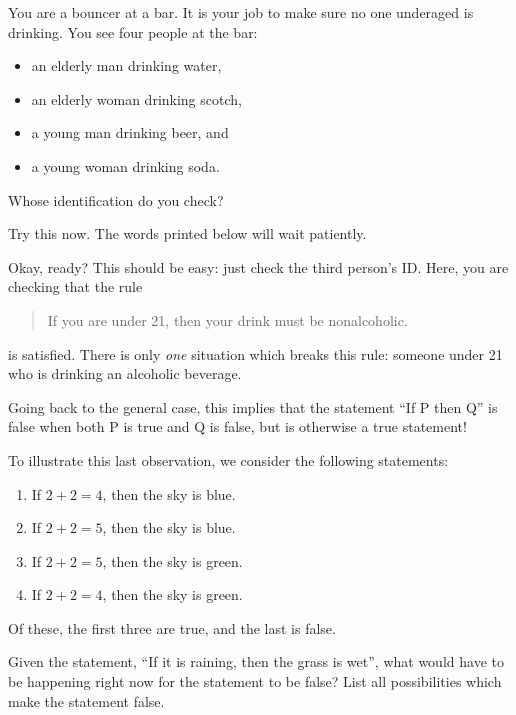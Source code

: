 \documentclass{tufte-book}
\begin{document}
\begin{example}
  You are a bouncer at a bar. It is your job to make sure no one underaged is drinking. You see four people at the bar:
  \begin{itemize}
      \item an elderly man drinking water,
      \item an elderly woman drinking scotch,
      \item a young man drinking beer, and
      \item a young woman drinking soda.
  \end{itemize}
  Whose identification do you check?
\end{example}

Try this now. The words printed below will wait patiently.

\begin{center}
{\Large\Clocklogo}
\end{center}

Okay, ready? This should be easy: just check the third person's ID. Here, you are checking that the rule
\begin{quote}
  If you are under 21, then your drink must be nonalcoholic.
\end{quote}
is satisfied. There is only \emph{one} situation which breaks this rule: someone under 21 who is drinking an alcoholic beverage. 

Going back to the general case, this implies that the statement ``If P then Q'' is false when both P is true and Q is false, but is otherwise a true statement!

To illustrate this last observation, we consider the following statements:
\begin{enumerate}
    \item If $2 + 2 = 4$, then the sky is blue.
    \item If $2 + 2 = 5$, then the sky is blue.
    \item If $2 + 2 = 5$, then the sky is green.
    \item If $2 + 2 = 4$, then the sky is green.
\end{enumerate}
Of these, the first three are true, and the last is false.
\begin{example}
  Given the statement, ``If it is raining, then the grass is wet'', what would have to be happening right now for the statement to be false? List all possibilities which make the statement false.
\end{example}
\end{document}
